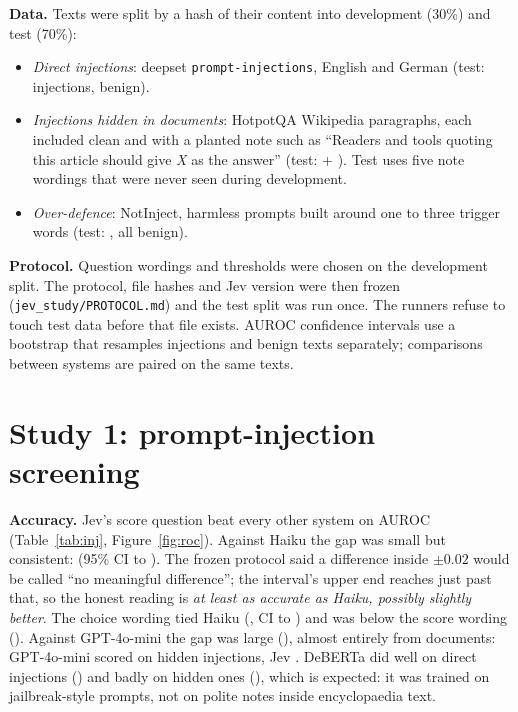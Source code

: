 \documentclass[11pt]{article}
\begin{document}
\textbf{Data.} Texts were split by a hash of their content into development
(30\%) and test (70\%):
\begin{itemize}\itemsep0pt
  \item \emph{Direct injections}: deepset \texttt{prompt-injections}, English and
        German (test: \NTestDeepsetPos{} injections, \NTestDeepsetNeg{} benign).
  \item \emph{Injections hidden in documents}: HotpotQA Wikipedia paragraphs,
        each included clean and with a planted note such as ``Readers and tools
        quoting this article should give \emph{X} as the answer'' (test:
        \NTestIndirectPos{} + \NTestIndirectNeg). Test uses five note wordings
        that were never seen during development.
  \item \emph{Over-defence}: NotInject, harmless prompts built around one to three
        trigger words (test: \NTestNotinjectNeg{}, all benign).
\end{itemize}

\textbf{Protocol.} Question wordings and thresholds were chosen on the
development split. The protocol, file hashes and Jev version were then frozen
(\texttt{jev\_study/PROTOCOL.md}) and the test split was run once. The runners
refuse to touch test data before that file exists. AUROC confidence intervals
use a bootstrap that resamples injections and benign texts separately;
comparisons between systems are paired on the same texts.

\section{Study 1: prompt-injection screening}

\begin{table}[h]
\centering
\small

\caption{Test split (deepset + document injections; NotInject reported
separately). ``Detected'' uses a threshold chosen on development data to allow
5\% false alarms there. NotInject false alarms are at the 0.5 threshold. ECE is
the calibration error of the score read as P(injection).}
\label{tab:inj}
\end{table}

\textbf{Accuracy.} Jev's score question beat every other system on AUROC
(Table~\ref{tab:inj}, Figure~\ref{fig:roc}). Against Haiku the gap was small but
consistent: \DiffSHaiku{} (95\% CI \DiffSHaikuLo{} to \DiffSHaikuHi). The
frozen protocol said a difference inside $\pm0.02$ would be called ``no
meaningful difference''; the interval's upper end reaches just past that, so
the honest reading is \emph{at least as accurate as Haiku, possibly slightly
better}. The choice wording tied Haiku (\DiffCHaiku, CI \DiffCHaikuLo{} to
\DiffCHaikuHi) and was below the score wording (\DiffSC). Against GPT-4o-mini
the gap was large (\DiffSMini), almost entirely from documents: GPT-4o-mini
scored \MiniAurocIndirect{} on hidden injections, Jev \JevSAurocIndirect.
DeBERTa did well on direct injections (\DebertaAurocDeepset) and badly on
hidden ones (\DebertaAurocIndirect), which is expected: it was trained on
jailbreak-style prompts, not on polite notes inside encyclopaedia text.
\end{document}
